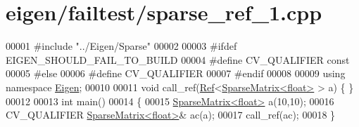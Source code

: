\hypertarget{eigen_2failtest_2sparse__ref__1_8cpp_source}{}\section{eigen/failtest/sparse\+\_\+ref\+\_\+1.cpp}
\label{eigen_2failtest_2sparse__ref__1_8cpp_source}

\begin{DoxyCode}
00001 \textcolor{preprocessor}{#include "../Eigen/Sparse"}
00002 
00003 \textcolor{preprocessor}{#ifdef EIGEN\_SHOULD\_FAIL\_TO\_BUILD}
00004 \textcolor{preprocessor}{#define CV\_QUALIFIER const}
00005 \textcolor{preprocessor}{#else}
00006 \textcolor{preprocessor}{#define CV\_QUALIFIER}
00007 \textcolor{preprocessor}{#endif}
00008 
00009 \textcolor{keyword}{using namespace }\hyperlink{namespace_eigen}{Eigen};
00010 
00011 \textcolor{keywordtype}{void} call\_ref(\hyperlink{group___core___module_class_eigen_1_1_ref}{Ref}<\hyperlink{group___sparse_core___module_class_eigen_1_1_sparse_matrix}{SparseMatrix<float>} > a) \{ \}
00012 
00013 \textcolor{keywordtype}{int} main()
00014 \{
00015   \hyperlink{group___sparse_core___module_class_eigen_1_1_sparse_matrix}{SparseMatrix<float>} a(10,10);
00016   CV\_QUALIFIER \hyperlink{group___sparse_core___module_class_eigen_1_1_sparse_matrix}{SparseMatrix<float>}& ac(a);
00017   call\_ref(ac);
00018 \}
\end{DoxyCode}
